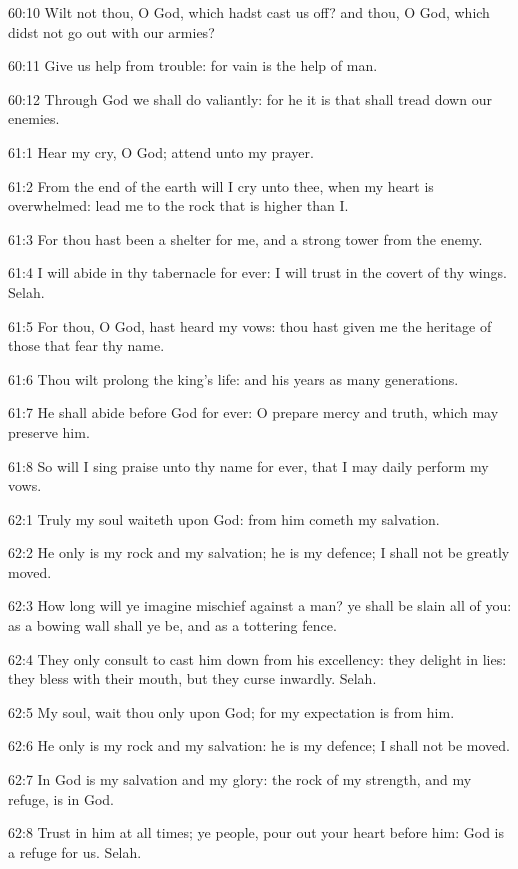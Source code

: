 60:10 Wilt not thou, O God, which hadst cast us off? and thou, O God,
which didst not go out with our armies?

60:11 Give us help from trouble: for vain is the help of man.

60:12 Through God we shall do valiantly: for he it is that shall tread
down our enemies.



61:1 Hear my cry, O God; attend unto my prayer.

61:2 From the end of the earth will I cry unto thee, when my heart is
overwhelmed: lead me to the rock that is higher than I.

61:3 For thou hast been a shelter for me, and a strong tower from the
enemy.

61:4 I will abide in thy tabernacle for ever: I will trust in the
covert of thy wings. Selah.

61:5 For thou, O God, hast heard my vows: thou hast given me the
heritage of those that fear thy name.

61:6 Thou wilt prolong the king's life: and his years as many
generations.

61:7 He shall abide before God for ever: O prepare mercy and truth,
which may preserve him.

61:8 So will I sing praise unto thy name for ever, that I may daily
perform my vows.



62:1 Truly my soul waiteth upon God: from him cometh my salvation.

62:2 He only is my rock and my salvation; he is my defence; I shall
not be greatly moved.

62:3 How long will ye imagine mischief against a man? ye shall be
slain all of you: as a bowing wall shall ye be, and as a tottering
fence.

62:4 They only consult to cast him down from his excellency: they
delight in lies: they bless with their mouth, but they curse inwardly.
Selah.

62:5 My soul, wait thou only upon God; for my expectation is from him.

62:6 He only is my rock and my salvation: he is my defence; I shall
not be moved.

62:7 In God is my salvation and my glory: the rock of my strength, and
my refuge, is in God.

62:8 Trust in him at all times; ye people, pour out your heart before
him: God is a refuge for us. Selah.


